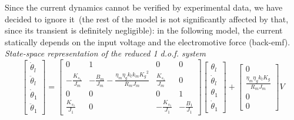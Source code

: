 Since the current dynamics cannot be verified by experimental data, we have decided to ignore it~(the rest of the model is not significantly affected by that, since its transient is definitely negligible): in the following model, the current statically depends on the input voltage and the electromotive force (back-emf).
\textit{State-space representation of the reduced 1 d.o.f. system}
\begin{equation}
	\begin{bmatrix}
		\dot{\theta}_l \\
		\ddot{\theta}_l \\
		\dot{\theta}_1 \\
		\ddot{\theta}_1
	\end{bmatrix}
	=
	\begin{bmatrix}
		0 &1 & 0 & 0 \\
		-\frac{K_{s_1}}{J_m} & -\frac{B_m}{J_m}-\frac{\eta_m \eta_g k_t k_m {K_g}^2}{R_m J_m}  & \frac{K_{s_1}}{J_m} & 0 \\
		0 & 0 & 0 & 1 \\
		\frac{K_{s_1}}{J_1} & 0 & -\frac{K_{s_1}}{J_1} & -\frac{B_1}{J_1}
	\end{bmatrix}
	\begin{bmatrix}
		\theta_l \\
		\dot{\theta}_l \\
		\theta_1 \\
		\dot{\theta}_1
	\end{bmatrix}
	+
	\begin{bmatrix}
		0 \\
		\frac{\eta_m \eta_g k_t K_g}{R_m J_m} \\
		0 \\
		0
	\end{bmatrix}
	V
\end{equation}

